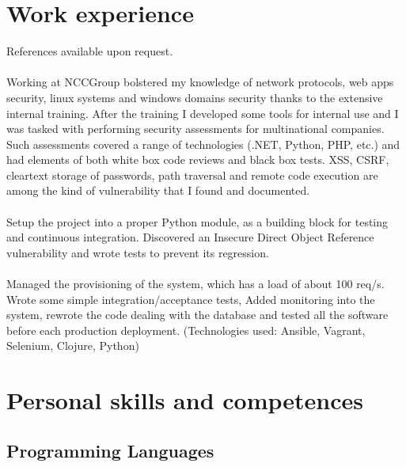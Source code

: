 \documentclass[helvetica,narrow,english,booktabs,a4paper]{moderncv}
\begin{document}
  \makecvtitle

  \section{Work experience}
  References available upon request.
  \\
  \\
  Working at NCCGroup bolstered my knowledge of network protocols, web apps security, linux systems and windows domains security thanks to the extensive internal training. After the training I developed some tools for internal use and I was tasked with performing security assessments for multinational companies. Such assessments covered a range of technologies (.NET, Python, PHP, etc.) and had elements of both white box code reviews and black box tests. XSS, CSRF, cleartext storage of passwords, path traversal and remote code execution are among the kind of vulnerability that I found and documented.
  \\
  \\
  Setup the project into a proper Python module, as a building block for testing and continuous integration. Discovered an Insecure Direct Object Reference vulnerability and wrote tests to prevent its regression.
  \\
  \\
  Managed the provisioning of the system, which has a load of about 100 req/s. Wrote some simple integration/acceptance tests, Added monitoring into the system, rewrote the code dealing with the database and tested all the software before each production deployment. (Technologies used: Ansible, Vagrant, Selenium, Clojure, Python)

  \section{Personal skills and competences}
  \subsection{Programming Languages}

\end{document}
